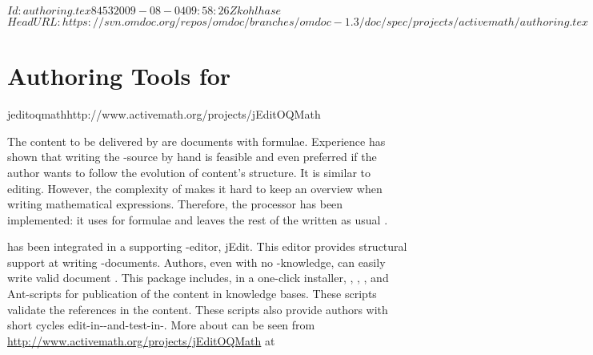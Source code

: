 \svnInfo $Id: authoring.tex 8453 2009-08-04 09:58:26Z kohlhase $
\svnKeyword $HeadURL: https://svn.omdoc.org/repos/omdoc/branches/omdoc-1.3/doc/spec/projects/activemath/authoring.tex $

\section{Authoring Tools for {\activemath}}
\begin{project}{jeditoqmath}{http://www.activemath.org/projects/jEditOQMath}
\end{project}


The {\omdoc} content to be delivered by {\activemath} are {\omdoc} documents with
{\openmath} formulae. Experience has shown that writing the {\xml}-source by hand is
feasible and even preferred if the author wants to follow the evolution of content's
structure.  It is similar to {\html} editing.  However, the complexity of {\xml} makes it
hard to keep an overview when writing mathematical expressions. Therefore, the
{} processor has been implemented: it uses {} for formulae and
leaves the rest of the {\omdoc} written as usual {\xml}.

{} has been integrated in a supporting {\xml}-editor, jEdit. This editor
provides structural support at writing {\xml}-documents. Authors, even with no
{\xml}-knowledge, can easily write valid document {}.  This package
includes, in a one-click installer, {\qmath}, {}, {}, and
Ant-scripts for publication of the content in {\activemath} knowledge bases.  These
scripts validate the references in the content.  These scripts also provide authors with
short cycles edit-in-{}-and-test-in-{\activemath}.  More about
{} can be seen from
{\url{http://www.activemath.org/projects/jEditOQMath}} at~\cite{AM-authoring-from-dev-on}


